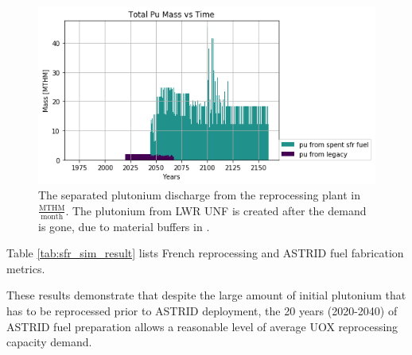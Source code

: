 \begin{figure}[htbp!]
	\begin{center}
		\includegraphics[scale=0.7]{./images/french-transition/pu.png}
	\end{center}
	\caption{The separated plutonium discharge from the reprocessing plant 
        in $\frac{\mbox{MTHM}}{\mbox{month}}$. The plutonium from \gls{LWR} \gls{UNF}
        is created after the demand is gone, due to material buffers in \Cyclus.}
	\label{fig:pu_no_cum}
\end{figure}

 Table \ref{tab:sfr_sim_result} lists French reprocessing and 
 \gls{ASTRID} fuel fabrication metrics.

\begin{table}[h]
	\centering
	\caption {In the French transition to \glspl{SFR},
				  the total legacy \gls{UNF} reprocessed is the 
                                  amount of \gls{UNF} France needs 
				  for a transition into a fully \gls{SFR} fleet. 
                          }
		
		\label{tab:sfr_sim_result}
\end {table}


These results demonstrate that despite the large amount of initial plutonium that has to be reprocessed
prior to \gls{ASTRID} deployment, the 20 years (2020-2040) of 
\gls{ASTRID} fuel preparation
allows a reasonable level of average
\gls{UOX} reprocessing capacity demand.